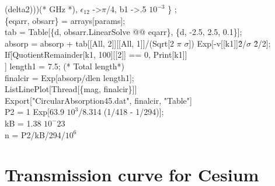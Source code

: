 (delta2)))(* GHz *), $\epsilon_{12}$ -\textgreater $\pi$/4, b1 -\textgreater  .5 $10^{-3}$ \} ;\\
 \{eqarr, obsarr\} = arrays[params];\\
   tab = Table[\{d, obsarr.LinearSolve @@ eqarr\}, \{d, -2.5, 2.5, 0.1\}];\\
 absorp = 
  absorp + tab[[All, 2]][[All, 
      1]]/(Sqrt[2 $\pi$ $\sigma$]) Exp[-v[[k1]]\^ 2/$\sigma$ \^ 2/2];\\
 If[QuotientRemainder[k1, 100][[2]] == 0, Print[k1]]\\ ]
length1 = 7.5; (* Total length*)\\
finalcir = Exp[absorp/dlen length1];\\
ListLinePlot[Thread[\{mag, finalcir\}]]\\
Export["CircularAbsorption45.dat", finalcir, "Table"]\\
P2 = 1 Exp[63.9 $10^3$/8.314 (1/418 - 1/294)];\\
kB = 1.38 $10^-{23}$\\
n = P2/kB/294/$10^6$ \\

\section{Transmission curve for Cesium}

